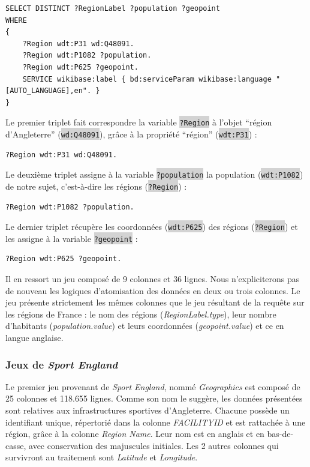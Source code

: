 \documentclass[hidelinks, 12pt]{article}
\newcommand{\code}[1]{\colorbox{LightGray}{\texttt{#1}}}
\begin{document}
\begin{lstlisting}[language=SPARQL]
SELECT DISTINCT ?RegionLabel ?population ?geopoint
WHERE
{
	?Region wdt:P31 wd:Q48091.
	?Region wdt:P1082 ?population.
	?Region wdt:P625 ?geopoint.
	SERVICE wikibase:label { bd:serviceParam wikibase:language "[AUTO_LANGUAGE],en". }
}
\end{lstlisting}

Le premier triplet fait correspondre la variable \code{?Region} à l'objet \enquote{région d'Angleterre} (\code{wd:Q48091}), grâce à la propriété \enquote{région} (\code{wdt:P31}) :

\begin{lstlisting}[language=SPARQL]
	?Region wdt:P31 wd:Q48091.
\end{lstlisting}

Le deuxième triplet assigne à la variable \code{?population} la population (\code{wdt:P1082}) de notre sujet, c'est-à-dire les régions (\code{?Region}) :

\begin{lstlisting}[language=SPARQL]
	?Region wdt:P1082 ?population.
\end{lstlisting}

Le dernier triplet récupère les coordonnées (\code{wdt:P625}) des régions (\code{?Region}) et les assigne à la variable \code{?geopoint} :

\begin{lstlisting}[language=SPARQL]
	?Region wdt:P625 ?geopoint.
\end{lstlisting}

Il en ressort un jeu composé de 9 colonnes et 36 lignes. Nous n'expliciterons pas de nouveau les logiques d'atomisation des données en deux ou trois colonnes. Le jeu présente strictement les mêmes colonnes que le jeu résultant de la requête sur les régions de France : le nom des régions (\textit{RegionLabel.type}), leur nombre d'habitants (\textit{population.value}) et leurs coordonnées (\textit{geopoint.value}) et ce en langue anglaise.





%





\subsubsection{Jeux de \textit{Sport England}}

Le premier jeu provenant de \textit{Sport England}, nommé \textit{Geographics} est composé de 25 colonnes et 118.655 lignes. Comme son nom le suggère, les données présentées sont relatives aux infrastructures sportives d'Angleterre. Chacune possède un identifiant unique, répertorié dans la colonne \textit{FACILITYID} et est rattachée à une région, grâce à la colonne \textit{Region Name}. Leur nom est en anglais et en bas-de-casse, avec conservation des majuscules initiales. Les 2 autres colonnes qui survivront au traitement sont \textit{Latitude} et \textit{Longitude}.
\end{document}
